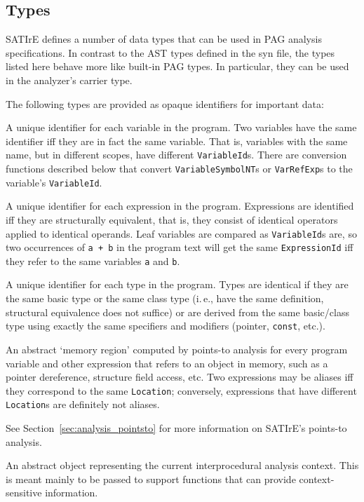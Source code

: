 \documentclass[a4paper,12pt]{report}
\begin{document}
\subsection{Types}
\label{sec:support_types}

SATIrE defines a number of data types that can be used in PAG analysis
specifications. In contrast to the AST types defined in the syn file, the
types listed here behave more like built-in PAG types. In particular, they
can be used in the analyzer's carrier type.

The following types are provided as opaque identifiers for important data:

\begin{description}
    A unique identifier for each variable in the program. Two variables have
    the same identifier iff they are in fact the same variable. That is,
    variables with the same name, but in different scopes, have different
    \texttt{VariableId}s. There are conversion functions described below
    that convert \texttt{VariableSymbolNT}s or \texttt{VarRefExp}s to the
    variable's \texttt{VariableId}.

    A unique identifier for each expression in the program. Expressions are
    identified iff they are structurally equivalent, that is, they consist
    of identical operators applied to identical operands. Leaf variables are
    compared as \texttt{VariableId}s are, so two occurrences of \verb|a + b|
    in the program text will get the same \texttt{ExpressionId} iff they
    refer to the same variables \texttt{a} and \texttt{b}.

    A unique identifier for each type in the program. Types are identical if
    they are the same basic type or the same class type (i.\,e., have the
    same definition, structural equivalence does not suffice) or are derived
    from the same basic/class type using exactly the same specifiers and
    modifiers (pointer, \texttt{const}, etc.).

    An abstract `memory region' computed by points-to analysis for every
    program variable and other expression that refers to an object in
    memory, such as a pointer dereference, structure field access, etc. Two
    expressions may be aliases iff they correspond to the same
    \texttt{Location}; conversely, expressions that have different
    \texttt{Location}s are definitely not aliases.

    See Section~\ref{sec:analysis_pointsto} for more information on SATIrE's
    points-to analysis.

    An abstract object representing the current interprocedural analysis
    context. This is meant mainly to be passed to support functions that can
    provide context-sensitive information.
\end{description}
\end{document}
